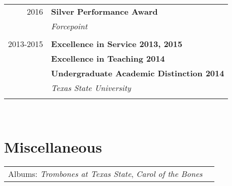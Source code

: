 \documentclass[10pt]{article} %
\begin{document}
\begin{minipage}[t]{0.44\textwidth}
\begin{tabular}{rl}
2016     & \textbf{Silver Performance Award}\\
& \textit{Forcepoint}\\ \\

2013-2015     & \textbf{Excellence in Service 2013, 2015}\\
& \textbf{Excellence in Teaching 2014}\\
& \textbf{Undergraduate Academic Distinction 2014}\\
& \textit{Texas State University}\\\\

\end{tabular}\\




\section{Miscellaneous} 

\begin{tabular}{ll}
Albums: \textit{Trombones at Texas State}, \textit{Carol of the Bones} \\
\end{tabular}\\

\end{minipage}
\end{document}
